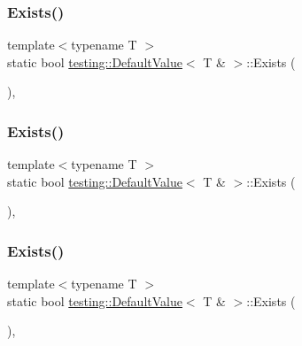 \subsubsection{\texorpdfstring{Exists()}{Exists()}\hspace{0.1cm}{\footnotesize\ttfamily [1/3]}}
{\footnotesize\ttfamily template$<$typename T $>$ \\
static bool \mbox{\hyperlink{classtesting_1_1_default_value}{testing\+::\+Default\+Value}}$<$ T \& $>$\+::Exists (\begin{DoxyParamCaption}{ }\end{DoxyParamCaption})\hspace{0.3cm}{\ttfamily [inline]}, {\ttfamily [static]}}

\mbox{\label{classtesting_1_1_default_value_3_01_t_01_6_01_4_a38420499e17d2fb4146ae6c4265f0d55}} 
\subsubsection{\texorpdfstring{Exists()}{Exists()}\hspace{0.1cm}{\footnotesize\ttfamily [2/3]}}
{\footnotesize\ttfamily template$<$typename T $>$ \\
static bool \mbox{\hyperlink{classtesting_1_1_default_value}{testing\+::\+Default\+Value}}$<$ T \& $>$\+::Exists (\begin{DoxyParamCaption}{ }\end{DoxyParamCaption})\hspace{0.3cm}{\ttfamily [inline]}, {\ttfamily [static]}}

\mbox{\label{classtesting_1_1_default_value_3_01_t_01_6_01_4_a38420499e17d2fb4146ae6c4265f0d55}} 
\subsubsection{\texorpdfstring{Exists()}{Exists()}\hspace{0.1cm}{\footnotesize\ttfamily [3/3]}}
{\footnotesize\ttfamily template$<$typename T $>$ \\
static bool \mbox{\hyperlink{classtesting_1_1_default_value}{testing\+::\+Default\+Value}}$<$ T \& $>$\+::Exists (\begin{DoxyParamCaption}{ }\end{DoxyParamCaption})\hspace{0.3cm}{\ttfamily [inline]}, {\ttfamily [static]}}


